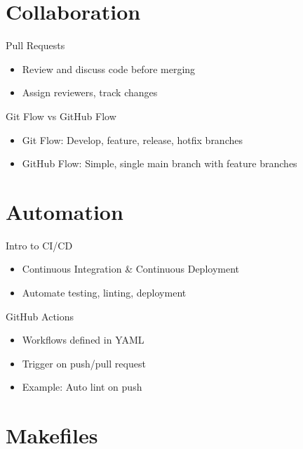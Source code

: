 \documentclass[aspectratio=169]{beamer} %
\begin{document}
\section{Collaboration}

\begin{frame}{Pull Requests}
  \begin{itemize}
    \item Review and discuss code before merging
    \item Assign reviewers, track changes
  \end{itemize}
\end{frame}

\begin{frame}{Git Flow vs GitHub Flow}
  \begin{itemize}
    \item Git Flow: Develop, feature, release, hotfix branches
    \item GitHub Flow: Simple, single main branch with feature branches
  \end{itemize}
\end{frame}

\section{Automation}

\begin{frame}{Intro to CI/CD}
  \begin{itemize}
    \item Continuous Integration \& Continuous Deployment
    \item Automate testing, linting, deployment
  \end{itemize}
\end{frame}

\begin{frame}{GitHub Actions}
  \begin{itemize}
    \item Workflows defined in YAML
    \item Trigger on push/pull request
    \item Example: Auto lint on push
  \end{itemize}
\end{frame}

\section{Makefiles}
\end{document}
